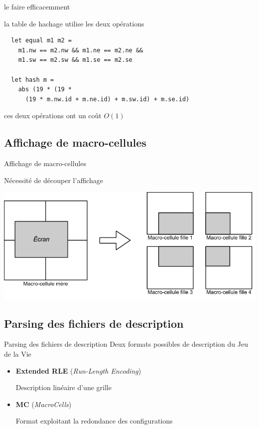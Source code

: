 \documentclass{beamer}
\begin{document}
\begin{frame}[fragile]{le faire efficacemment}

  la table de hachage utilise les deux opérations
  
\begin{verbatim}
  let equal m1 m2 =
    m1.nw == m2.nw && m1.ne == m2.ne && 
    m1.sw == m2.sw && m1.se == m2.se
      
  let hash m = 
    abs (19 * (19 * 
      (19 * m.nw.id + m.ne.id) + m.sw.id) + m.se.id)
\end{verbatim}

  ces deux opérations ont \alert{un coût $O(1)$}

\end{frame}

\subsection{Affichage de macro-cellules}

\begin{frame}{Affichage de macro-cellules}

  \begin{center}
    Nécessité de \alert{découper} l'affichage

    \medskip

    \includegraphics[scale=0.4]{decoupage_graphique.png}
  \end{center}
\end{frame}

\subsection{Parsing des fichiers de description}

\begin{frame}{Parsing des fichiers de description}
  Deux formats possibles de description du Jeu de la Vie
  \begin{itemize}
    \item \textbf{Extended RLE} (\textit{Run-Length Encoding})

      Description linéaire d'une grille

      \medskip

    \item \textbf{MC} (\textit{MacroCells})

      Format exploitant la redondance des configurations

  \end{itemize}
\end{frame}
\end{document}
